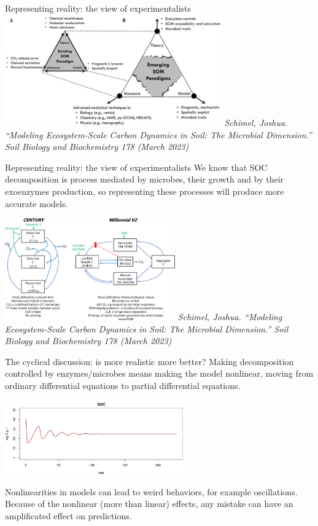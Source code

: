 \documentclass[
  ignorenonframetext,
]{beamer}
\begin{document}
\begin{frame}{Representing reality: the view of experimentalists}
\protect\hypertarget{representing-reality-the-view-of-experimentalists}{}
\includegraphics[width=0.7\textwidth,height=\textheight]{Schimel.jpg}
\emph{Schimel, Joshua. ``Modeling Ecosystem-Scale Carbon Dynamics in
Soil: The Microbial Dimension.'' Soil Biology and Biochemistry 178
(March 2023)}
\end{frame}

\begin{frame}{Representing reality: the view of experimentalists}
\protect\hypertarget{representing-reality-the-view-of-experimentalists-1}{}
We know that SOC decomposition is process mediated by microbes, their
growth and by their exoenzymes production, so representing these
processes will produce more accurate models.

\includegraphics[width=0.55\textwidth,height=\textheight]{Schimel2.jpg}
\emph{Schimel, Joshua. ``Modeling Ecosystem-Scale Carbon Dynamics in
Soil: The Microbial Dimension.'' Soil Biology and Biochemistry 178
(March 2023)}
\end{frame}

\begin{frame}{The cyclical discussion: is more realistic more better?}
\protect\hypertarget{the-cyclical-discussion-is-more-realistic-more-better}{}
Making decomposition controlled by enzymes/microbes means making the
model nonlinear, moving from ordinary differential equations to partial
differential equations.

\includegraphics[width=0.6\textwidth,height=\textheight]{SOC.png}

Nonlinearities in models can lead to weird behaviors, for example
oscillations. Because of the nonlinear (more than linear) effects, any
mistake can have an amplificated effect on predictions.
\end{frame}
\end{document}
